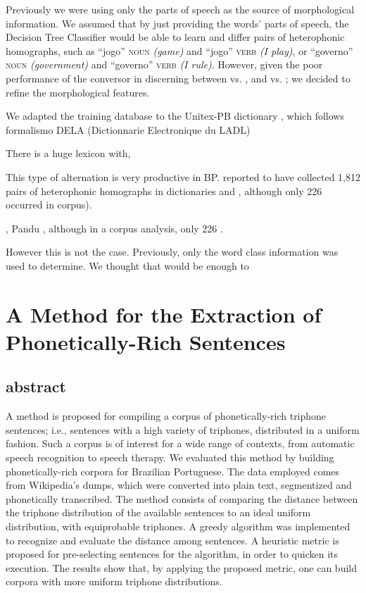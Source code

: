 Previously we were using only the parts of speech as the source of morphological information. We assumed that by just providing the words' parts of speech, the Decision Tree Classifier would be able to learn and differ pairs of heterophonic homographs, such as ``jogo'' \textsc{noun} \emph{(game)} and ``jogo'' \textsc{verb} \emph{(I play)}, or ``governo'' \textsc{noun} \emph{(government)} and ``governo'' \textsc{verb} \emph{(I rule)}. However, given the poor performance of the conversor in discerning between \textipa{[E]} vs. \textipa{[e]}, and \textipa{[O]} vs. \textipa{[o]}; we decided to refine the morphological features. 

We adapted the training database to the Unitex-PB dictionary \cite{Muniz2004}, which follows  formalismo DELA (Dictionnarie Electronique du LADL)

There is a huge lexicon with,

This type of alternation is very productive in \ac{BP}.  reported to have collected 1,812 pairs of heterophonic homographs in dictionaries and , although only 226 occurred in corpus).

\citeauthor{}, Pandu , although in a corpus analysis, only 226 \cite{Shulby2013}.

However this is not the case. Previously, only the word class information was used to determine. We thought that would be enough to 

\section{A Method for the Extraction of Phonetically-Rich Sentences}


\subsection{abstract}
A method is proposed for compiling a corpus of phonetically-rich triphone sentences; 
i.e., sentences with a high variety of triphones, distributed in a uniform fashion. 
Such a corpus is of interest for a wide range of contexts, from automatic speech 
recognition to speech therapy. We evaluated this method by building phonetically-rich corpora for Brazilian Portuguese. The data employed comes 
from Wikipedia's dumps, which were converted into plain text, segmentized and 
phonetically transcribed. The method consists of comparing the distance between 
the triphone distribution of the available sentences to an ideal uniform distribution, with 
equiprobable triphones. A greedy algorithm was implemented to recognize and evaluate 
the distance among sentences. A heuristic metric is proposed for pre-selecting 
sentences for the algorithm, in order to quicken its execution. The results show 
that, by applying the proposed metric, one can build corpora with more uniform 
triphone distributions.


